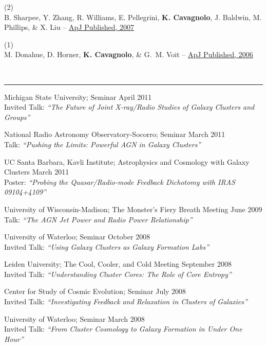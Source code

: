 \documentclass[12pt]{cv}
\newcommand{\myhead}{Cavagnolo, CV}
\begin{document}
(2) {}\\
B. Sharpee, Y. Zhang, R. Williams, E. Pellegrini, {\bf K. Cavagnolo}, J. Baldwin, M. Phillips, \& X. Liu --
\href{http://adsabs.harvard.edu/abs/2007ApJ...659.1265S}{ApJ Published, 2007}

(1) {}\\
M. Donahue, D. Horner, {\bf K. Cavagnolo}, \& G.~M. Voit --
\href{http://adsabs.harvard.edu/abs/2006ApJ...643..730D}{ApJ Published, 2006}

\markright{\myhead}
{\large{}}\vspace{-0.3cm}\\
\rule{\linewidth}{0.5pt}
Michigan State University; Seminar \hfill April 2011\\
Invited Talk: {\textit{``The Future of Joint X-ray/Radio Studies of Galaxy Clusters and Groups''}}

National Radio Astronomy Observatory-Socorro; Seminar \hfill March 2011\\
Talk: {\textit{``Pushing the Limits: Powerful AGN in Galaxy Clusters''}}

UC Santa Barbara, Kavli Institute; Astrophysics and Cosmology with Galaxy Clusters \hfill March 2011\\
Poster: {\textit{``Probing the Quasar/Radio-mode Feedback Dichotomy with IRAS 09104+4109''}}

University of Wisconsin-Madison; The Monster's Fiery Breath Meeting \hfill June 2009\\
Talk: {\textit{``The AGN Jet Power and Radio Power Relationship''}}

University of Waterloo; Seminar \hfill October 2008\\
Invited Talk: {\textit{``Using Galaxy Clusters as Galaxy Formation Labs''}}

Leiden University; The Cool, Cooler, and Cold Meeting \hfill September 2008\\
Invited Talk: {\textit{``Understanding Cluster Cores: The Role of Core Entropy''}}
 
Center for Study of Cosmic Evolution; Seminar \hfill July 2008\\
Invited Talk: {\textit{``Investigating Feedback and Relaxation in Clusters of Galaxies''}}

University of Waterloo; Seminar \hfill March 2008\\
Invited Talk: {\textit{``From Cluster Cosmology to Galaxy Formation in Under One Hour''}}
\end{document}
